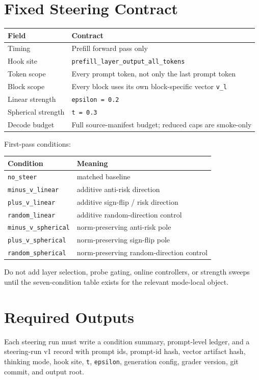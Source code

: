 \documentclass[11pt]{article}
\begin{document}
\section*{Fixed Steering Contract}
\begin{center}
\begin{tabularx}{\textwidth}{lX}
\toprule
Field & Contract \\
\midrule
Timing & Prefill forward pass only \\
Hook site & \texttt{prefill\_layer\_output\_all\_tokens} \\
Token scope & Every prompt token, not only the last prompt token \\
Block scope & Every block uses its own block-specific vector \texttt{v\_l} \\
Linear strength & \texttt{epsilon = 0.2} \\
Spherical strength & \texttt{t = 0.3} \\
Decode budget & Full source-manifest budget; reduced caps are smoke-only \\
\bottomrule
\end{tabularx}
\end{center}

First-pass conditions:
\begin{center}
\begin{tabular}{ll}
\toprule
Condition & Meaning \\
\midrule
\texttt{no\_steer} & matched baseline \\
\texttt{minus\_v\_linear} & additive anti-risk direction \\
\texttt{plus\_v\_linear} & additive sign-flip / risk direction \\
\texttt{random\_linear} & additive random-direction control \\
\texttt{minus\_v\_spherical} & norm-preserving anti-risk pole \\
\texttt{plus\_v\_spherical} & norm-preserving sign-flip pole \\
\texttt{random\_spherical} & norm-preserving random-direction control \\
\bottomrule
\end{tabular}
\end{center}

Do not add layer selection, probe gating, online controllers, or strength sweeps
until the seven-condition table exists for the relevant mode-local object.

\section*{Required Outputs}
Each steering run must write a condition summary, prompt-level ledger, and a
steering-run v1 record with prompt ids,
prompt-id hash, vector artifact hash, thinking mode, hook site, \texttt{t},
\texttt{epsilon}, generation config, grader version, git commit, and output
root.
\end{document}
